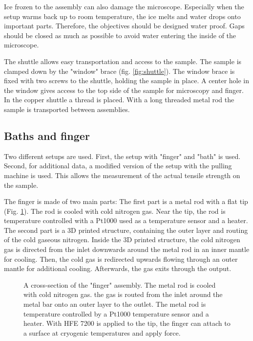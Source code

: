 Ice frozen to the assembly can also damage the microscope. Especially when the setup warms back up to room temperature, the ice melts and water drops onto important parts. Therefore, the objectives should be designed water proof. Gaps should be closed as much as possible to avoid water entering the inside of the microscope.

The shuttle allows easy transportation and access to the sample. The sample is clamped down by the "window" brace (fig. \ref{fig:shuttle}). The window brace is fixed with two screws to the shuttle, holding the sample in place. A center hole in the window gives access to the top side of the sample for microscopy and finger. In the copper shuttle a thread is placed. With a long threaded metal rod the sample is transported between assemblies.

\subsection{Baths and finger}

Two different setups are used. First, the setup with "finger" and "bath" is used. Second, for additional data, a modified version of the setup with the pulling machine is used. This allows the measurement of the actual tensile strength on the sample. 

The finger is made of two main parts: The first part is a metal rod with a flat tip (Fig. \ref{fig:querschnittfinger}). The rod is cooled with cold nitrogen gas. Near the tip, the rod is temperature controlled with a Pt1000 used as a temperature sensor and a heater. The second part is a 3D printed structure, containing the outer layer and routing of the cold gaseous nitrogen. Inside the 3D printed structure, the cold nitrogen gas is directed from the inlet downwards around the metal rod in an inner mantle for cooling. Then, the cold gas is redirected upwards flowing through an outer mantle for additional cooling. Afterwards, the gas exits through the output.

\begin{figure}[hbt!]
	\centering
	
	\caption{A cross-section of the "finger" assembly. The metal rod is cooled with cold nitrogen gas. the gas is routed from the inlet around the metal bar onto an outer layer to the outlet. The metal rod is temperature controlled by a Pt1000 temperature sensor and a heater. With HFE 7200 is applied to the tip, the finger can attach to a surface at cryogenic temperatures and apply force. }
	\label{fig:querschnittfinger}
\end{figure}

